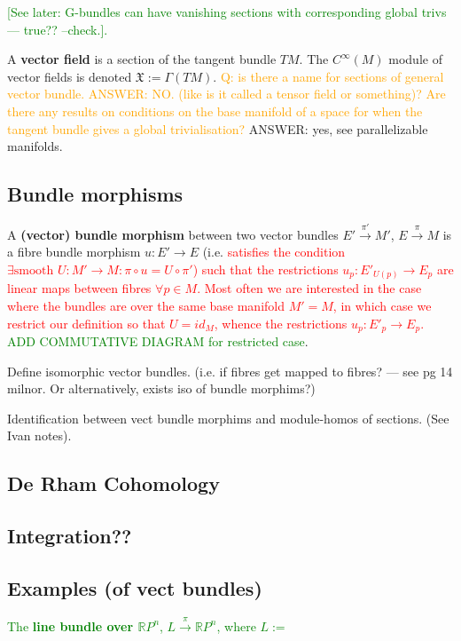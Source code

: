 \documentclass[a4paper]{article}
\theoremstyle{definition} \newtheorem*{definition}{Definition}
\theoremstyle{definition} \newtheorem*{definitions}{Definitions}
\theoremstyle{plain} \newtheorem{theorem}{Theorem}[section]
\theoremstyle{plain} \newtheorem{proposition}[theorem]{Proposition}
\theoremstyle{plain} \newtheorem{corollary}[theorem]{Corollary}
\theoremstyle{plain} \newtheorem{lemma}[theorem]{Lemma}
\theoremstyle{plain} \newtheorem{example}[theorem]{Example}
\newcommand{\checkCorrect}[1]{\textcolor{red}{#1}}
\newcommand{\question}[1]{\textcolor{orange}{#1}}
\newcommand{\finish}[1]{\textcolor{green}{#1}}
\newcommand{\defn}[1]{\textbf{#1}}
\newcommand{\realnos}{\mathbb{R}}
\begin{document}
\finish{[See later: G-bundles can have vanishing sections with corresponding global trivs --- true?? --check.].}

A \defn{vector field} is a section of the tangent bundle $TM$. The $C^\infty (M)$ module of vector fields is denoted $\mathfrak{X}:=\Gamma(TM)$.
\question{Q: is there a name for sections of general vector bundle. ANSWER: NO. (like is it called a tensor field or something)?} \question{Are there any results on conditions on the base manifold of a space for when the tangent bundle gives a global trivialisation? } ANSWER: yes, see parallelizable manifolds.

\subsection{Bundle morphisms} 

A \defn{(vector) bundle morphism} between two vector bundles $E'\xrightarrow{\pi '} M'$,  $E\xrightarrow{\pi} M$ is a fibre bundle morphism $u:E'\to E$ (i.e. \checkCorrect{satisfies the condition $\exists \textrm{smooth } U:M'\to M: \pi\circ u=U\circ \pi '$) such that the restrictions $u_p:E'_{U(p)}\to E_p$ are linear maps between fibres $\forall p \in M$.
Most often we are interested in the case where the bundles are over the same base manifold $M'=M$, in which case we restrict our definition so that $U=\mathit{id}_M$, whence the restrictions $u_p:E'_p\to E_p$. } \finish{ADD COMMUTATIVE DIAGRAM for restricted case}.

Define isomorphic vector bundles. (i.e. if fibres get mapped to fibres? --- see pg 14 milnor. Or alternatively, exists iso of bundle morphims?)


Identification between vect bundle morphims and module-homos of sections. (See Ivan notes).

\subsection{De Rham Cohomology}

\subsection{Integration??}

\subsection{Examples (of vect bundles)}

\finish{The \defn{line bundle over $\realnos P^n$}, $L\xrightarrow{\pi} \realnos P^n$, where $L:= $}
\end{document}

